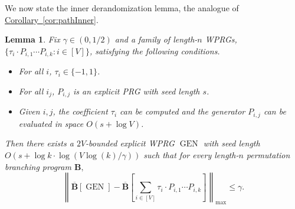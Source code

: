 \documentclass[11pt]{article}
\numberwithin{equation}{section}
\newtheorem{lemma}[theorem]{Lemma}
\theoremstyle{definition}
\theoremstyle{plain}
\newcommand{\expref}[2]{\hyperref[#2]{#1~\ref{#2}}}
\newcommand{\lbar}{\left\|}
\newcommand{\rbar}{\right\|}
\DeclareMathOperator{\gen}{GEN}
\newcommand{\bp}{{\mathbf{B}}}
\newcommand{\bbp}{\overline{\mathbf{B}}}
\begin{document}
We now state the inner derandomization lemma, the analogue of \expref{Corollary}{cor:pathInner}.
\begin{lemma}\label{lem:cycleInner}
Fix $\gamma\in(0,1/2)$ and a family of length-$n$ WPRGs, %
%
 $\{\tau_i\cdot  P_{i,1}\cdots P_{i,k}:i\in [V]\}$, satisfying the following 
%
conditions.  %
\begin{itemize}
    \item For all $i$, $\tau_i\in \{-1,1\}$.
    \item For all $i_j$, $P_{i,j}$ is an explicit PRG with seed length $s$.
    \item Given $i,j$, the coefficient $\tau_i$ can be computed and the generator $P_{i,j}$ can be evaluated in space $O(s+\log V)$.
\end{itemize}
Then there exists a $2V$-bounded explicit WPRG $\gen$ with seed length $O(s+ \log k\cdot \log(V\log(k)/\gamma))$ such that for every length-$n$ permutation branching program $\bp,$
$$\lbar\bbp[\gen]- \bbp\left[\sum_{i\in[V]}\tau_i \cdot P_{i,1}\cdots P_{i,k}\right]\rbar_{\max} \leq \gamma.$$
\end{lemma}
\end{document}
